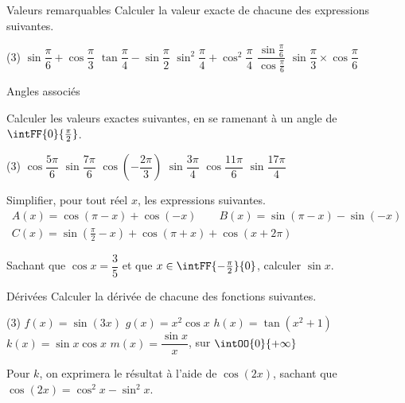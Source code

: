 \exercices
{}

\begin{exercice}[1]{Valeurs remarquables}
Calculer la valeur exacte de chacune des expressions suivantes.
\begin{tasks}(3)
  \task $\sin\dfrac{\pi}{6}+\cos\dfrac{\pi}{3}$
  \task $\tan\dfrac{\pi}{4}-\sin\dfrac{\pi}{2}$
  \task $\sin^{2}\dfrac{\pi}{4}+\cos^{2}\dfrac{\pi}{4}$
  \task $\dfrac{\sin\frac{\pi}{6}}{\cos\frac{\pi}{6}}$
  \task $\sin\dfrac{\pi}{3}\times\cos\dfrac{\pi}{6}$
\end{tasks}
\end{exercice}

\begin{exercice}[1]{Angles associés}
\begin{questions}
  \item Calculer les valeurs exactes suivantes, en se ramenant à un angle de $\intFF{0}{\frac{\pi}{2}}$.
\begin{tasks}(3)
  \task $\cos\dfrac{5\pi}{6}$
  \task $\sin\dfrac{7\pi}{6}$
  \task $\cos\left(-\dfrac{2\pi}{3}\right)$
  \task $\sin\dfrac{3\pi}{4}$
  \task $\cos\dfrac{11\pi}{6}$
  \task $\sin\dfrac{17\pi}{4}$
\end{tasks}
  \item Simplifier, pour tout réel $x$, les expressions suivantes.
    \begin{gather*}
      A(x)=\cos(\pi-x)+\cos(-x) \qquad B(x)=\sin(\pi-x)-\sin(-x) \\
      C(x)=\sin\left(\tfrac{\pi}{2}-x\right)+\cos(\pi+x)+\cos(x+2\pi)
    \end{gather*}
  \item Sachant que $\cos x=\dfrac35$ et que $x\in\intFF{-\frac{\pi}{2}}{0}$, calculer $\sin x$.
\end{questions}
\end{exercice}


\begin{exercice}[2]{Dérivées}
Calculer la dérivée de chacune des fonctions suivantes.
\begin{tasks}(3)
  \task $f(x)=\sin(3x)$
  \task $g(x)=x^{2}\cos x$
  \task $h(x)=\tan\left(x^{2}+1\right)$
  \task $k(x)=\sin x\cos x$
  \task $m(x)=\dfrac{\sin x}{x}$, sur $\intOO{0}{+\infty}$
\end{tasks}
Pour $k$, on exprimera le résultat à l'aide de $\cos(2x)$, sachant que $\cos(2x)=\cos^{2}x-\sin^{2}x$.
\end{exercice}

